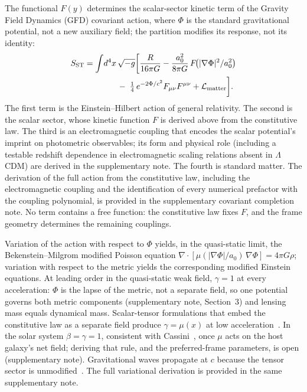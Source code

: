 \documentclass[twocolumn]{iopjournal}
\begin{document}
The functional $F(y)$ determines the scalar-sector kinetic
term of the Gravity Field Dynamics (GFD) covariant action,
where $\Phi$ is the standard gravitational potential, not a
new auxiliary field; the partition modifies its response, not
its identity:
\begin{align}
  S_{\text{ST}} &= \int\!d^4x\,\sqrt{-g}\biggl[
    \frac{R}{16\pi G}
    - \frac{a_0^2}{8\pi G}\,F\!\bigl(|\nabla\Phi|^2/a_0^2\bigr)
    \notag\\
    &\qquad\qquad
    -\; \tfrac{1}{4}\,e^{-2\Phi/c^2}
    F_{\mu\nu}F^{\mu\nu}
    + \mathcal{L}_{\text{matter}}
  \biggr].
  \label{eq:sst}
\end{align}
The first term is the Einstein--Hilbert action of general
relativity.  The second is the scalar sector, whose kinetic
function $F$ is derived above from the constitutive law.  The
third is an electromagnetic coupling that encodes the
scalar potential's imprint on photometric observables; its
form and physical role (including a testable redshift
dependence in electromagnetic scaling relations absent in
$\Lambda$CDM) are derived in the supplementary
note.  The fourth is
standard matter.  The derivation of the full action from the
constitutive law, including the electromagnetic coupling
and the identification
of every numerical prefactor with the coupling polynomial, is
provided in the supplementary covariant completion note.  No
term contains a free function: the constitutive law fixes $F$,
and the frame geometry determines the remaining couplings.

Variation of the action with respect to $\Phi$ yields,
in the quasi-static limit, the Bekenstein--Milgrom modified
Poisson equation
$\nabla\!\cdot[\mu(|\nabla\Phi|/a_0)\,\nabla\Phi] = 4\pi G\rho$;
variation with respect to the metric yields the corresponding
modified Einstein equations.
At leading order in the quasi-static weak field, $\gamma = 1$
at every acceleration: $\Phi$ is the lapse of the metric, not
a separate field, so one potential governs both metric
components (supplementary note, Section~3) and lensing mass
equals dynamical mass.  Scalar-tensor formulations that embed
the constitutive law as a separate field produce
$\gamma = \mu(x)$ at low acceleration~\cite{Bekenstein2004}.
In the solar system $\beta = \gamma = 1$, consistent with
Cassini~\cite{Bertotti2003}, once $\mu$ acts on the host
galaxy's net field; deriving that rule, and the
preferred-frame parameters, is open (supplementary note).
Gravitational waves propagate
at $c$ because the tensor sector is
unmodified~\cite{Abbott2017}.  The full variational
derivation is provided in the same supplementary note.
\end{document}
